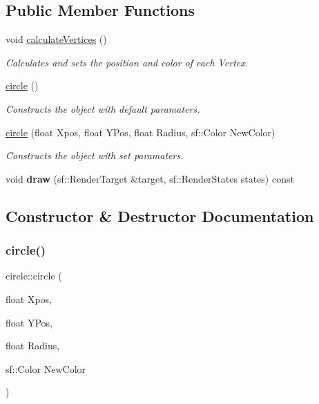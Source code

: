 \subsection*{Public Member Functions}
\begin{DoxyCompactItemize}
\item 
\mbox{\label{classcircle_a59ddd77fe7255e30bd2d95d2e8114aec}} 
void \mbox{\hyperlink{classcircle_a59ddd77fe7255e30bd2d95d2e8114aec}{calculate\+Vertices}} ()
\begin{DoxyCompactList}\small\item\em Calculates and sets the position and color of each Vertex. \end{DoxyCompactList}\item 
\mbox{\label{classcircle_a4e0786fc75051f3bbe5de2e08ef9712d}} 
\mbox{\hyperlink{classcircle_a4e0786fc75051f3bbe5de2e08ef9712d}{circle}} ()
\begin{DoxyCompactList}\small\item\em Constructs the object with default paramaters. \end{DoxyCompactList}\item 
\mbox{\hyperlink{classcircle_ad0b8c457c164f957281a8022308dace7}{circle}} (float Xpos, float Y\+Pos, float Radius, sf\+::\+Color New\+Color)
\begin{DoxyCompactList}\small\item\em Constructs the object with set paramaters. \end{DoxyCompactList}\item 
\mbox{\label{classcircle_a6cc69d3a0c147bb2c7e2a4bd91490e75}} 
void {\bfseries draw} (sf\+::\+Render\+Target \&target, sf\+::\+Render\+States states) const
\end{DoxyCompactItemize}


\subsection{Constructor \& Destructor Documentation}
\mbox{\label{classcircle_ad0b8c457c164f957281a8022308dace7}} 
\subsubsection{\texorpdfstring{circle()}{circle()}}
{\footnotesize\ttfamily circle\+::circle (\begin{DoxyParamCaption}\item[{float}]{Xpos,  }\item[{float}]{Y\+Pos,  }\item[{float}]{Radius,  }\item[{sf\+::\+Color}]{New\+Color }\end{DoxyParamCaption})}




